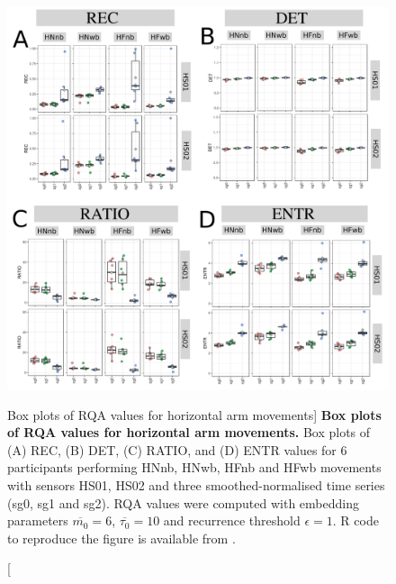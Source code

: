 \begin{figure}
\centering
\includegraphics[width=1.0\textwidth]{fig_5_13}
	\caption
	[Box plots of RQA values for horizontal arm movements]{
	{\bf Box plots of RQA values for horizontal arm movements.}
	Box plots of (A) REC, (B) DET, (C) RATIO, and (D) ENTR values 
	for 6 participants performing HNnb, HNwb, HFnb and HFwb movements
	with sensors HS01, HS02 and three smoothed-normalised  
	time series (sg0, sg1 and sg2).
	RQA values were computed with 
	embedding parameters $\overline{m_0}=6$, $\overline{\tau_0}=10$ and 
	recurrence threshold $\epsilon=1$.
	R code to reproduce the figure is available from \cite{xochicale2018}.
        }
    \label{fig:BPRQAH}
\end{figure}

